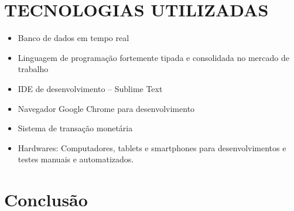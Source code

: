\documentclass[12pt]{article}
\begin{document}
    \section{TECNOLOGIAS UTILIZADAS }
        \begin{itemize}
            \item Banco de dados em tempo real
            \item Linguagem de programação fortemente tipada e consolidada no mercado de trabalho
            \item IDE de desenvolvimento – Sublime Text
            \item Navegador Google Chrome para desenvolvimento 
            \item Sistema de transação monetária
            \item Hardwares: Computadores, tablets e smartphones para desenvolvimentos e testes manuais e automatizados.
        \end{itemize}
        
    \section{Conclusão}
    
\end{document}
